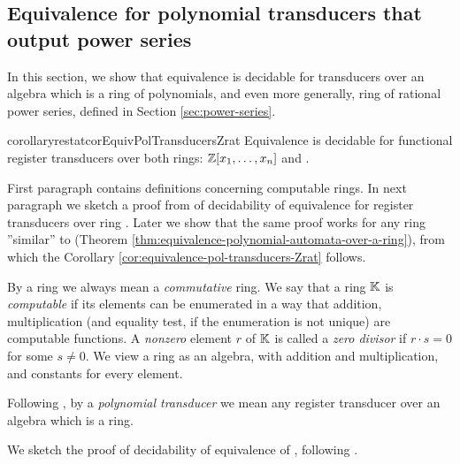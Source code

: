 \subsection{Equivalence for polynomial transducers that output power series}\label{sec:pol-transducers-any-ring}


In this section, we show that equivalence is decidable for transducers over an algebra which is a ring of polynomials, and even more generally, ring of rational power series, defined in Section \ref{sec:power-series}.
\begin{restatable}{corollaryrestat}{corEquivPolTransducersZrat}\label{cor:equivalence-pol-transducers-Zrat}
		Equivalence is decidable for functional register transducers over both rings: $\mathbb{Z}[x_{1}, \ldots, x_{n}]$ and \Zrat.
\end{restatable}
First paragraph contains definitions concerning computable rings. In next paragraph we sketch a proof from \cite[Lemma ??]{seidlManethKemper2018} of decidability of equivalence for register transducers over ring \Z. Later we show that the same proof works for any ring ''similar'' to \Z (Theorem \ref{thm:equivalence-polynomial-automata-over-a-ring}), from which the Corollary \ref{cor:equivalence-pol-transducers-Zrat} follows.

By a ring we always mean a \emph{commutative} ring.
We say that a ring ${\mathbb K}$ is \emph{computable} if its elements can be enumerated in a way that addition, multiplication (and equality test, if the enumeration is not unique) are computable functions. A \emph{nonzero} element $r$ of ${\mathbb K}$ is called a \emph{zero divisor} if $r \cdot s = 0$ for some $s \neq 0$. We view a ring as an algebra, with addition and multiplication, and constants for every element.

Following \cite{seidlManethKemper2018}, by a \emph{polynomial transducer} we mean any register transducer over an algebra which is a ring.

We sketch the proof of decidability of equivalence of \polTsover{\Z}, following \cite{seidlManethKemper2018}.

